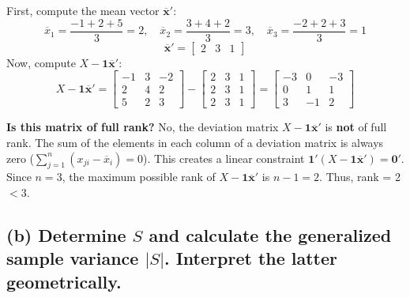 \documentclass[11pt,a4paper]{article}
\begin{document}
First, compute the mean vector $\overline{\mathbf{x}}'$:
\[
\overline{x}_1 = \frac{-1+2+5}{3} = 2, \quad \overline{x}_2 = \frac{3+4+2}{3} = 3, \quad \overline{x}_3 = \frac{-2+2+3}{3} = 1
\]
\[
\overline{\mathbf{x}}' = \begin{bmatrix} 2 & 3 & 1 \end{bmatrix}
\]
Now, compute $X - \mathbf{1}\overline{\mathbf{x}}'$:
\[
X - \mathbf{1}\overline{\mathbf{x}}' = \begin{bmatrix} -1 & 3 & -2 \\ 2 & 4 & 2 \\ 5 & 2 & 3 \end{bmatrix} - \begin{bmatrix} 2 & 3 & 1 \\ 2 & 3 & 1 \\ 2 & 3 & 1 \end{bmatrix} = \begin{bmatrix} -3 & 0 & -3 \\ 0 & 1 & 1 \\ 3 & -1 & 2 \end{bmatrix}
\]

\textbf{Is this matrix of full rank?}
No, the deviation matrix $X - \mathbf{1}\overline{\mathbf{x}}'$ is \textbf{not} of full rank. The sum of the elements in each column of a deviation matrix is always zero ($\sum_{j=1}^n (x_{ji} - \overline{x}_i) = 0$). This creates a linear constraint $\mathbf{1}'(X - \mathbf{1}\overline{\mathbf{x}}') = \mathbf{0}'$. Since $n=3$, the maximum possible rank of $X - \mathbf{1}\overline{\mathbf{x}}'$ is $n-1 = 2$. Thus, rank = 2 $< 3$.

\subsection*{(b) Determine $S$ and calculate the generalized sample variance $|S|$. Interpret the latter geometrically.}
\end{document}
